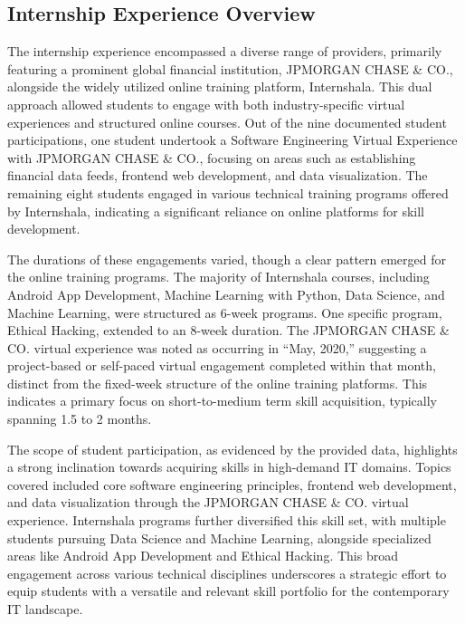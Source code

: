 \documentclass[11pt,a4paper]{article}
\newenvironment{card}{
    \begin{tcolorbox}[
        enhanced,
        colback=cardback,
        colframe=border,
        sharp corners,
        boxrule=0.5pt,
        drop shadow,
        drop shadow={shadow xshift=1mm,shadow yshift=-1mm,fill=border!50},
        boxsep=3mm,
        left=5mm, right=5mm, top=5mm, bottom=5mm,
        width=\textwidth,
        nobeforeafter
    ]
}{\end{tcolorbox}}
\begin{document}
\vspace{0.5cm}

\begin{card}
    \subsection*{\textcolor{accent}{Internship Experience Overview}}
    \vspace{0.3cm}
    The internship experience encompassed a diverse range of providers, primarily featuring a prominent global financial institution, JPMORGAN CHASE \& CO., alongside the widely utilized online training platform, Internshala. This dual approach allowed students to engage with both industry-specific virtual experiences and structured online courses. Out of the nine documented student participations, one student undertook a Software Engineering Virtual Experience with JPMORGAN CHASE \& CO., focusing on areas such as establishing financial data feeds, frontend web development, and data visualization. The remaining eight students engaged in various technical training programs offered by Internshala, indicating a significant reliance on online platforms for skill development.

    The durations of these engagements varied, though a clear pattern emerged for the online training programs. The majority of Internshala courses, including Android App Development, Machine Learning with Python, Data Science, and Machine Learning, were structured as 6-week programs. One specific program, Ethical Hacking, extended to an 8-week duration. The JPMORGAN CHASE \& CO. virtual experience was noted as occurring in ``May, 2020,'' suggesting a project-based or self-paced virtual engagement completed within that month, distinct from the fixed-week structure of the online training platforms. This indicates a primary focus on short-to-medium term skill acquisition, typically spanning 1.5 to 2 months.

    The scope of student participation, as evidenced by the provided data, highlights a strong inclination towards acquiring skills in high-demand IT domains. Topics covered included core software engineering principles, frontend web development, and data visualization through the JPMORGAN CHASE \& CO. virtual experience. Internshala programs further diversified this skill set, with multiple students pursuing Data Science and Machine Learning, alongside specialized areas like Android App Development and Ethical Hacking. This broad engagement across various technical disciplines underscores a strategic effort to equip students with a versatile and relevant skill portfolio for the contemporary IT landscape.
\end{card}
\end{document}
